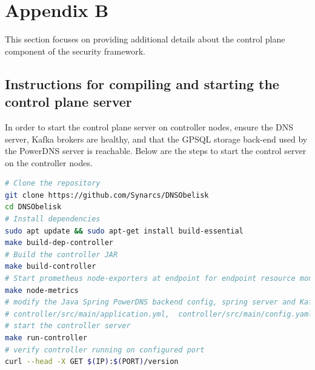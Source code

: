 \documentclass [11pt, proquest] {uwthesis}[2020/02/24]
\begin{document}
\section{Appendix B}
This section focuses on providing additional details about the control plane component of the security framework. 

\subsection{Instructions for compiling and starting the control plane server}
In order to start the control plane server on controller nodes, ensure the DNS server, Kafka brokers are healthy, and that the GPSQL storage back-end used by the PowerDNS server is reachable. Below are the steps to start the control server on the controller nodes.

{\footnotesize
\begin{lstlisting}[language=bash, 
    caption={Installation steps for compiling and running controller server in control plane}, 
    label={lst:install-steps-control-plane},
    aboveskip=0.5em, 
    belowskip=0.5em
]
# Clone the repository
git clone https://github.com/Synarcs/DNSObelisk
cd DNSObelisk
# Install dependencies
sudo apt update && sudo apt-get install build-essential 
make build-dep-controller 
# Build the controller JAR
make build-controller 
# Start prometheus node-exporters at endpoint for endpoint resource monitoring 
make node-metrics
# modify the Java Spring PowerDNS backend config, spring server and Kafka broker connection config to point to correct endpoints
# controller/src/main/application.yml,  controller/src/main/config.yaml
# start the controller server
make run-controller
# verify controller running on configured port
curl --head -X GET $(IP):$(PORT)/version 
\end{lstlisting}
}



\end{document}
